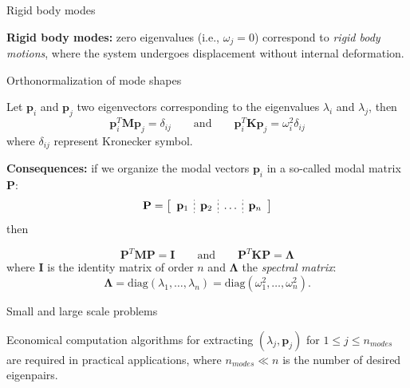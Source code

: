 \documentclass[aspectratio=169]{beamer}
\begin{document}
{\begin{frame}{Rigid body modes}
  \begin{block}{}
    \textbf{Rigid body modes:} zero eigenvalues (i.e., \( \omega_j = 0 \)) correspond to \emph{rigid body motions}, where the system undergoes displacement without internal deformation.
  \end{block}
\end{frame}

\begin{frame}{Orthonormalization of mode shapes}
  \begin{block}{}
    Let $\mathbf p_i$ and $\mathbf p_j$ two eigenvectors corresponding to the  eigenvalues $\lambda_i$ and $\lambda_j$, then
    $$
      \mathbf p_i^T\mathbf M\mathbf p_j  =\delta_{ij}
      \qquad\text{and}\qquad
      \mathbf p_i^T\mathbf K\mathbf p_j  =\omega_i^2\delta_{ij}
    $$
    where $\delta_{ij}$ represent Kronecker symbol.
  \end{block}
  \textbf{Consequences:} if we organize the modal vectors $\mathbf p_i$ in a so-called modal matrix $\mathbf P$:
  $$\mathbf P=\left[ \begin{array}{c;{2pt/2pt}c;{2pt/2pt}c;{2pt/2pt}c}
        \mathbf p_{1} & \mathbf p_{2} & \dots & \mathbf p_{n} \\
      \end{array}\right]$$
  then
  \begin{block}{}
    $$  \mathbf P^T\mathbf M\mathbf P  =\mathbf I       \qquad\text{and}\qquad
      \mathbf P^T\mathbf K\mathbf P  =\mathbf\Lambda$$
    where $\mathbf I$ is the identity matrix of order $n$ and $\mathbf\Lambda$ the \emph{spectral matrix}:
    $$\mathbf\Lambda=\text{diag}(\lambda_1,\dots,\lambda_n)=\text{diag}(\omega_1^2,\dots,\omega_n^2).$$
  \end{block}
\end{frame}

\begin{frame}{Small and large scale problems}
  \vspace{-0.3cm}
  \begin{tcolorbox}[colback=darkred!10,colframe=darkred!40!black]
    Economical computation algorithms for extracting $(\lambda_j,\mathbf p_j)$ for $1\leq j \leq n_{modes}$ are required in practical applications, where $n_{modes}\ll n$ is the number of desired eigenpairs.
  \end{tcolorbox}


\end{frame}}
\end{document}
